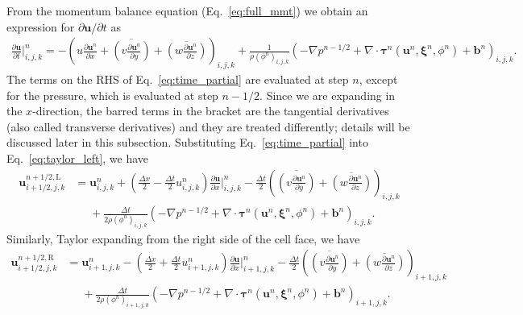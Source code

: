 \documentclass[times, 10pt]{article}
\renewcommand{\vec}[1]{\mathbf{#1}}
\newcommand{\p}{\partial}
\newcommand{\vu}{\vec{u}}
\newcommand{\vb}{\vec{b}}
\newcommand{\vxi}{\boldsymbol\xi}
\newcommand{\vtau}{\boldsymbol\tau}
\begin{document}
From the momentum balance equation (Eq.~\eqref{eq:full_mmt}) we obtain an expression for $\p \vu/\p t$ as
\begin{align}
\frac{\p \vu}{\p t}\bigg |^n_{i,j,k}  = - \left ( u \frac{\p \vu^n}{\p x}
+ \overline{\left(v\frac{\p \vu^n}{\p y}\right)}
+ \overline{\left(w\frac{\p \vu^n}{\p z}\right)} \right )_{i,j,k}
+ \frac{1}{\rho(\phi^n)_{i,j,k}} \left (- \nabla p^{n-1/2} + \nabla \cdot \vtau^n(\vu^n, \vxi^n, \phi^n) + \vb^n \right)_{i,j,k}.
\label {eq:time_partial}
\end{align}
The terms on the RHS of Eq.~\eqref{eq:time_partial} are evaluated at step $n$, except for
the pressure, which is evaluated at step $n-1/2$.
Since we are expanding in the $x$-direction, the barred terms in the bracket
are the tangential derivatives (also called transverse derivatives) and they
are treated differently; details will be discussed later in this subsection.
Substituting Eq.~\eqref{eq:time_partial} into Eq.~\eqref{eq:taylor_left}, we have
\begin{align}
  \vu^{n+1/2,\text{L}}_{i+1/2,j,k} &= \vu^{n}_{i,j,k} + \left( \frac{\Delta x}{2} - \frac{\Delta t}{2} u^n_{i,j,k} \right) \frac{\p \vu}{\p x} \bigg |^n_{i,j,k}
                                   - \frac{\Delta t}{2} \left (\overline{\left(v\frac{\p \vu^n}{\p y}\right)} + \overline{\left(w\frac{\p \vu^n}{\p z}\right)} \right )_{i,j,k} \nonumber \\
                                   &\phantom{=} +  \frac{\Delta t }{2 \rho(\phi^n)_{i,j,k}} \left (- \nabla p^{n-1/2} + \nabla \cdot \vtau^n(\vu^n, \vxi^n, \phi^n) + \vb^n \right)_{i,j,k}.
\label{eq:left_final}
\end{align}
Similarly, Taylor expanding from the right side of the cell face, we have
\begin{align}
  \vu^{n+1/2,\text{R}}_{i+1/2,j,k} &= \vu^{n}_{i+1,j,k} - \left( \frac{\Delta x}{2} + \frac{\Delta t}{2} u^n_{i+1,j,k} \right) \frac{\p \vu}{\p x} \bigg |^n_{i+1,j,k} 
                                   - \frac{\Delta t}{2}\left (\overline{\left(v\frac{\p \vu^n}{\p y}\right)} + \overline{\left(w\frac{\p \vu^n}{\p z}\right)} \right )_{i+1,j,k} \nonumber \\
  & \phantom{=}+ \frac{\Delta t}{2\rho(\phi^n)_{i+1,j,k}} \left (- \nabla p^{n-1/2} + \nabla \cdot \vtau^n(\vu^n, \vxi^n, \phi^n) + \vb^n \right)_{i+1,j,k}.
\label{eq:right_final}
\end{align}
\end{document}
